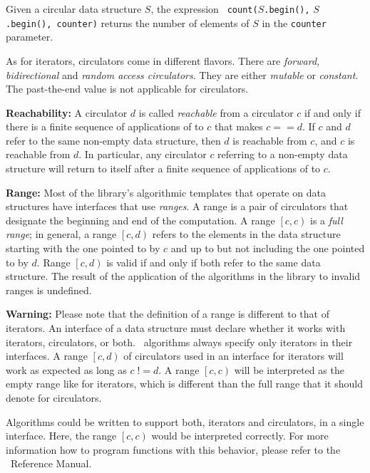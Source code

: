 Given a circular data structure $S$, the expression {\tt
  count(}$S${\tt.begin(),} $S${\tt.begin(), counter)} returns the
number of elements of $S$ in the {\tt counter} parameter.

As for iterators, circulators come in different flavors. There are
{\em forward, bidirectional\/} and {\em random access circulators}.
They are either {\em mutable} or {\em constant}. The past-the-end
value is not applicable for circulators.

{\bf Reachability:} 
A circulator $d$ is called {\em reachable} from a circulator $c$ if
and only if there is a finite sequence of applications of
 to $c$ that makes $c == d$. If $c$ and $d$ refer
to the same non-empty data structure, then $d$ is reachable from $c$,
and $c$ is reachable from $d$. In particular, any circulator $c$
referring to a non-empty data structure will return to itself after a
finite sequence of applications of  to $c$.

{\bf Range:} 
Most of the library's algorithmic templates that operate on data
structures have interfaces that use {\em ranges}. A range is a pair of
circulators that designate the beginning and end of the computation. A
range $\left[c, c\right)$ is a {\em full range}; in general, a range
$\left[c, d\right)$ refers to the elements in the data structure
starting with the one pointed to by $c$ and up to but not including
the one pointed to by $d$. Range $\left[c, d\right)$ is valid if and
only if both refer to the same data structure.  The result of the
application of the algorithms in the library to invalid ranges is
undefined.

{\bf Warning:} Please note that the definition of a range is different
to that of iterators. An interface of a data structure must declare
whether it works with iterators, circulators, or both. \stl\ algorithms
always specify only iterators in their interfaces. A range $\left[c,
  d\right)$ of circulators used in an interface for iterators will
work as expected as long as $c\; !\!= d$. A range $\left[c, c\right)$ will
be interpreted as the empty range like for iterators, which is
different than the full range that it should denote for circulators.

Algorithms could be written to support both, iterators and
circulators, in a single interface. Here, the range $\left[c,
  c\right)$ would be interpreted correctly. For more information how
to program functions with this behavior, please refer to the \cgal\ 
Reference Manual.

